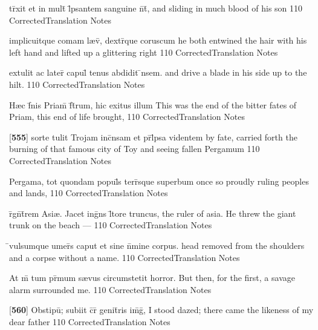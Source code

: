 \latline
  {tr\={}xit et in mult\={} l\={}psantem sanguine n\={}t\={\macron {\i}},}
  { and sliding in much blood of his son }
  {110}
  { CorrectedTranslation }
  { Notes }


\latline
  {implicuitque comam l{\ae}v\={}, dextr\={}que coruscum}
  { he both entwined the hair with his left hand and lifted up a glittering right }
  {110}
  { CorrectedTranslation }
  { Notes }


\latline
  {extulit ac later\={\macron {\i}} capul\={} tenus abdidit \={}nsem.}
  { and drive a blade in his side up to the hilt. }
  {110}
  { CorrectedTranslation }
  { Notes }


\latline
  {H{\ae}c f\={\macron {\i}}nis Priam\={\macron {\i}} f\={}t\={}rum, hic exitus illum}
  { This was the end of the bitter fates of Priam, this end of life brought, }
  {110}
  { CorrectedTranslation }
  { Notes }


\latline
  {[\textbf{555}] sorte tulit Trojam inc\={}nsam et pr\={}l\={}psa videntem}
  { by fate, carried forth the burning of that famous city of Toy and seeing fallen Pergamum }
  {110}
  { CorrectedTranslation }
  { Notes }


\latline
  {Pergama, tot quondam popul\={\macron {\i}}s terr\={\macron {\i}}sque superbum}
  { once so proudly ruling peoples and lands, }
  {110}
  { CorrectedTranslation }
  { Notes }


\latline
  {r\={}gn\={}t\={}rem Asi{\ae}.  Jacet ing\={}ns l\={\macron {\i}}tore truncus,}
  { the ruler of asia.  He threw the giant trunk on the beach --- }
  {110}
  { CorrectedTranslation }
  { Notes }


\latline
  {\={}vulsumque umer\={\macron {\i}}s caput et sine n\={}mine corpus.}
  { head removed from the shoulders and a corpse without a name. }
  {110}
  { CorrectedTranslation }
  { Notes }


\latline
  {At m\={} tum pr\={\macron {\i}}mum s{\ae}vus circumstetit horror.}
  { But then, for the first, a savage alarm surrounded me. }
  {110}
  { CorrectedTranslation }
  { Notes }


\latline
  {[\textbf{560}] Obstipu\={\macron {\i}}; subiit c\={}r\={\macron {\i}} genit\={}ris im\={}g\={},}
  { I stood dazed; there came the likeness of my dear father }
  {110}
  { CorrectedTranslation }
  { Notes }


